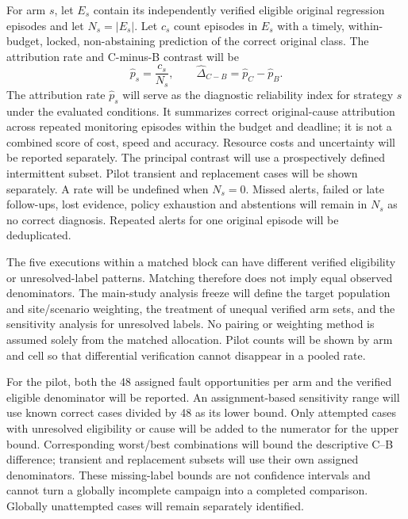 For arm $s$, let $E_s$ contain its independently verified eligible original regression episodes and let $N_s=|E_s|$. Let $c_s$ count episodes in $E_s$ with a timely, within-budget, locked, non-abstaining prediction of the correct original class. The attribution rate and C-minus-B contrast will be
\begin{equation}
\widehat{p}_s=\frac{c_s}{N_s},\qquad
\widehat{\Delta}_{C-B}=\widehat{p}_C-\widehat{p}_B.
\label{eq:primary-attribution}
\end{equation}
The attribution rate $\widehat{p}_s$ will serve as the diagnostic reliability index for strategy $s$ under the evaluated conditions. It summarizes correct original-cause attribution across repeated monitoring episodes within the budget and deadline; it is not a combined score of cost, speed and accuracy. Resource costs and uncertainty will be reported separately.
The principal contrast will use a prospectively defined intermittent subset. Pilot transient and replacement cases will be shown separately. A rate will be undefined when $N_s=0$. Missed alerts, failed or late follow-ups, lost evidence, policy exhaustion and abstentions will remain in $N_s$ as no correct diagnosis. Repeated alerts for one original episode will be deduplicated.

The five executions within a matched block can have different verified eligibility or unresolved-label patterns. Matching therefore does not imply equal observed denominators. The main-study analysis freeze will define the target population and site/scenario weighting, the treatment of unequal verified arm sets, and the sensitivity analysis for unresolved labels. No pairing or weighting method is assumed solely from the matched allocation. Pilot counts will be shown by arm and cell so that differential verification cannot disappear in a pooled rate.

For the pilot, both the 48 assigned fault opportunities per arm and the verified eligible denominator will be reported. An assignment-based sensitivity range will use known correct cases divided by 48 as its lower bound. Only attempted cases with unresolved eligibility or cause will be added to the numerator for the upper bound. Corresponding worst/best combinations will bound the descriptive C--B difference; transient and replacement subsets will use their own assigned denominators. These missing-label bounds are not confidence intervals and cannot turn a globally incomplete campaign into a completed comparison. Globally unattempted cases will remain separately identified.

